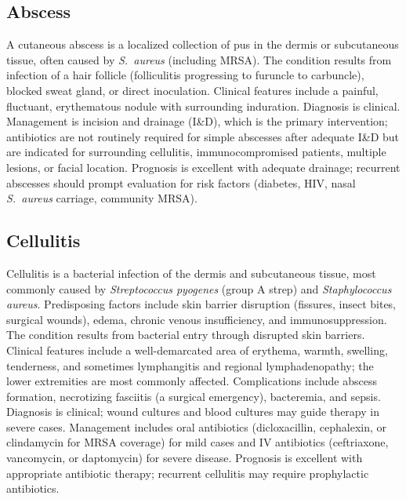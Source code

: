 

\label{sec:Skin Infections}

\subsection{Abscess}
\label{sec:Abscess}
A cutaneous abscess is a localized collection of pus in the dermis or subcutaneous tissue, often caused by \textit{S.~aureus} (including MRSA). The condition results from infection of a hair follicle (folliculitis progressing to furuncle to carbuncle), blocked sweat gland, or direct inoculation. Clinical features include a painful, fluctuant, erythematous nodule with surrounding induration. Diagnosis is clinical. Management is incision and drainage (I\&D), which is the primary intervention; antibiotics are not routinely required for simple abscesses after adequate I\&D but are indicated for surrounding cellulitis, immunocompromised patients, multiple lesions, or facial location. Prognosis is excellent with adequate drainage; recurrent abscesses should prompt evaluation for risk factors (diabetes, HIV, nasal \textit{S.~aureus} carriage, community MRSA).

\subsection{Cellulitis}
\label{sec:Cellulitis}
Cellulitis is a bacterial infection of the dermis and subcutaneous tissue, most commonly caused by \textit{Streptococcus pyogenes} (group A strep) and \textit{Staphylococcus aureus}. Predisposing factors include skin barrier disruption (fissures, insect bites, surgical wounds), edema, chronic venous insufficiency, and immunosuppression. The condition results from bacterial entry through disrupted skin barriers. Clinical features include a well-demarcated area of erythema, warmth, swelling, tenderness, and sometimes lymphangitis and regional lymphadenopathy; the lower extremities are most commonly affected. Complications include abscess formation, necrotizing fasciitis (a surgical emergency), bacteremia, and sepsis. Diagnosis is clinical; wound cultures and blood cultures may guide therapy in severe cases. Management includes oral antibiotics (dicloxacillin, cephalexin, or clindamycin for MRSA coverage) for mild cases and IV antibiotics (ceftriaxone, vancomycin, or daptomycin) for severe disease. Prognosis is excellent with appropriate antibiotic therapy; recurrent cellulitis may require prophylactic antibiotics.

